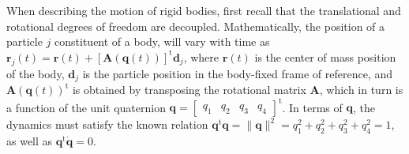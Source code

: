 \documentclass[aip,jcp,reprint,amsmath,amssymb]{revtex4-1}
\newcommand{\mt}[1]{\boldsymbol{\mathbf{#1}}}           %
\newcommand{\vt}[1]{\boldsymbol{\mathbf{#1}}}           %
\newcommand{\tr}[1]{#1^\text{t}}                        %
\begin{document}
When describing the motion of rigid bodies, first recall that the translational and rotational degrees of freedom are decoupled. Mathematically, the position of a particle $j$ constituent of a body, will vary with time as $\vt r_j(t) = \vt r(t) + \tr{[{\mt A}(\vt q(t))]}\vt d_j$, where $\vt r(t)$ is the center of mass position of the body, $\vt d_j$ is the particle position in the body-fixed frame of reference, and $\tr{\mt A(\vt q(t))}$ is obtained by transposing the rotational matrix $\mt A$, which in turn is a function of the unit quaternion $\vt q = \tr {[\begin{array}{cccc} q_1 & q_2 & q_3 & q_4 \end{array}]}$. In terms of $\vt q$, the dynamics must satisfy the known relation\cite{Goldstein2002} $\tr{\vt q}{\vt q} = \|\vt q\|^2 = q_1^2 + q_2^2 + q_3^2 + q_4^2 = 1$, as well as $\tr{\vt q}{\dot{\vt q}} = 0$.
\end{document}
